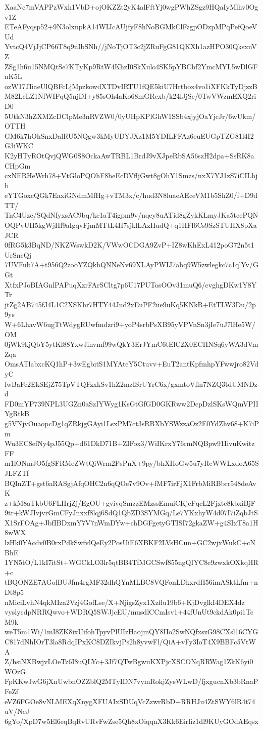 XaaNc7mVAPPzWxh1VbD+ojOKZZt2yK4alFftYj0wgPWhZSgz9HQaIyMlhv0Ogv1Z
ETeAFyqsp52+9N3olxnpkA14WIJcAUjfyF8hNoBGMkClFzgpODzpMPqPefQoeVUd
YvtcQ4VjJjCP66T8q9nIbSNh//jNoTjOT3c2jZRuFgG81QKXh1azHPO30QksxnVZ
ZSg1h6u15NMQtSe7KTyKp9RtW4KhzI0SkXulo4SK5pYBCbf2YmcMYL5wDlGFnK5L
ozW17JIiaeUlQBFcLjMpzkowdXTDvIRTU1fQE5kiU7Hrtbox4vo1iXFKkTyDjzzB
M82LcLZ1NfWIFqQ5njDI+y85sOh4aKo68mGRexb/k24lJjSc/0TwVWzmEXQ2riD0
5UtkN3hZXMZcDClpMe3nRVZW0/0yUHpKPlGhW1SSb4xjyjOaYjcJr/6wUkm/OTTH
GM6k7hOhSnxDalRU5NQgw3kMyUDYJXz1M5YDILFFAz6euEUGpTZG81l4I2G3iWKC
K2yHTyROtQvjQWG0S8OckaAwTRBL1BrdJ9vXJpeRbSA56szH2dpa+SsRK8aCHpGm
cxNERHeWrh78+VtGloPQOhF8beEcDVfljGwt8gOhY1Smzs/nxX7YJ1zS7iCILhjb
eYTGoxcQGk7EaxiGNdmMfHg+vTM3x/c/hud3N8luaeAEceVM1b5ShZ0/f+D9dTT/
TnC4Uzc/SQdNfyxsAC9bq/ke1aT4igpm9v/nqey8uATid8gZykKLmyJKa5tcePQN
OQPvUH5kgWjHf9aIgqvFjmMTtL4H7sjklLAzHudQ+q1HFl6Cs9SzSTUHX8pXaJCR
0fRG5k3BqND/NKZWswkD2K/VWwOCDGA9ZvP+IZ8wKhExL412poG72n5t1UrSncQj
7UVFub7A+t956Q2zooYZQkbQNNeNv69XLAyPWIJ7abq9W5zwlegkc7c1qlYv/GGt
XtfxPJoBIAGnlPAPuqXzrFArSCltg7p6U17PUTosOOv31muQ6/cvghgDKw1Y8YTr
jtZg2AB745fJ4L1C2XSKhr7HTY44Jud2xEuPF2ue9uKq5KNkR+EtTLW3Du/2p9ys
W+6LhavW6ugTtWdygRUwfmdzri9+yoP4srbPsXB95yVPVnSn3jIe7uJ7lHe5W/OM
0jWk9kjQbY5ytKl88YxwJinvmf99wQkY3ErJYmC6tElC2X0ECHNSq6yWA3dVmZqa
OmsATlabxcKQ1hP+3wEgbriS1MYAteY5Ctuvv+EuT2antKpfmhpYFwwjro82VdyC
lwBaFc2EkSEjZ75TpVTQFzxkSv1hZ2mzISrUYrC6x/gxmtoVfln7NZQ3tdUMNDzd
FD0mYP739NPL3UGZn0aSzIYWyg1KsGtGfGD0GKRww2DcpDzlSKsWQmVPIIYgRtkB
g5VNjvOuaopcDg1qZRkjgGAyi1LsxPM7ct3sRBXbYSWzzaOz2E0YdZhv68+K7iPm
Wu3EC8efNy4pJ55Qp+d61DkD71B+ZIFox3/WiIKrxY76rmNQBpw91IivuKwitzFF
m1lONmJO5fgSFRMeZWtQiWrm2PsPnX+9py/bhXHoGw5u7yReWWLxdoA65SJLFZTf
BQInZT+gst6aRASgjAfqOHC2n6qQOe7v9Ov+fMF7irFjX1FrbMiRBbrr548deAvK
z+kM8aTkbU6FLHrjZj/EgOU+gvivqSmzzEMzssEmuiCKjcFqcL2Fjxtc8kbxiBjF
9tr+kWJIvjvrGmCFyJnxxf8lqj6SdQ1QbZD3SYMGq/Le7YKxhyW4d07I7iZqbJtS
X1SrFOAg+JbfIBDxmY7V7nWmDYw+chDGFgetyGTISI72gkaZW+g4SIxT8a1H8wWX
lzHk0YAcdv0B0rxPdkSwfvlQeEy2PosUiE6XBKF2LVsHCun+GC2wjxWukC+cNBhE
1YN5tO/L1kI7itSt+WGCkLO3lr5qtBB4TfMGCSwf855ngQIYC8e9zwxkOXkqHR+c
tBQONZE7AGolBUJfm4rgMF32dhQYnMLBC8VQFonLDkxrdH56imASktLfm+nDt8p5
nMiciLvhN4qkMIza2Vzj4GofLse/X+NjigsZyx1Xzflu19b6+KjDvglkI4DEX4dz
vyslycdpNRRQwvo+WDRQ5SWJjcEU/musdlCCmIsv1+44fUnUt9ckdAk0pi1TcM9k
weT5m1Wi/1mI8ZK8ixUifohTpyvPlUIzHaojmQY8IIo2SwNQfxszG98CXsl16CYG
C817dNhIOrT3la8RdqIPxKC8DZIkvjPs2h8yvwFl/QiA+vFy3IoT4X9BBFc5VtWA
Z/hsiNXBwjvLOeTz6I8uQLYc+3Jf7QTwBgwuKXPjcXSCONqRRWag1ZkK6yi0WOzG
FpKKwJwG6jXnUwbnOZZblQ2MTyIDN7vymRokjZysWLwD/fjxgucnXb3bRnaPFeZf
eVZ6FGOe8vNLMEXqXnygXFUAIxSDUqVcZzwrRbD+RRHJu4ZtSWY6lR4t74uV/NeJ
6gYo/XpD7w5El6eqBqRvURvFwZse5Qh8xOiqqnX3Kk6Eirliz1dl9KUyGOdAEqsx

